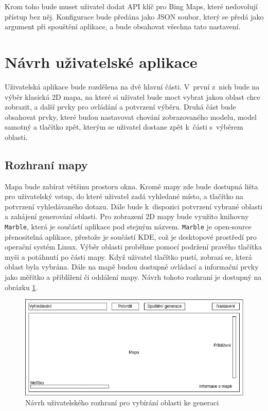 Krom toho bude muset uživatel dodat API klíč pro Bing Maps, které nedovolují přístup bez něj. Konfigurace bude předána jako JSON soubor, který se předá jako argument při spouštění aplikace, a bude obsahovat všechna tato nastavení.


\section{Návrh uživatelské aplikace}
Uživatelská aplikace bude rozdělena na dvě hlavní části. V~první z~nich bude na výběr klasická 2D mapa, na které si uživatel bude moct vybrat jakou oblast chce zobrazit, a další prvky pro ovládání a potvrzení výběru. Druhá část bude obsahovat prvky, které budou nastavovat chování zobrazovaného modelu, model samotný a tlačítko zpět, kterým se uživatel dostane zpět k~části s~výběrem oblasti.

\subsection*{Rozhraní mapy}
Mapa bude zabírat většinu prostoru okna. Kromě mapy zde bude dostupná lišta pro uživatelský vstup, do které uživatel zadá vyhledané místo, a tlačítko na potvrzení vyhledávaného dotazu. Dále bude k~dispozici potvrzení vybrané oblasti a zahájení generování oblasti. Pro zobrazení 2D mapy bude využito knihovny \verb|Marble|, která je součástí aplikace pod stejným názvem. \verb|Marble| je open-source přenositelná aplikace, přestože je součástí KDE, což je desktopové prostředí pro operační systém Linux. Výběr oblasti proběhne pomocí podržení pravého tlačítka myši a potáhnutí po části mapy. Když uživatel tlačítko pustí, zobrazí se, která oblast byla vybrána. Dále na mapě budou dostupné ovládací a informační prvky jako měřítko a přiblížení či oddálení mapy. Návrh tohoto rozhraní je dostupný na obrázku \ref{map-ui}.

\begin{figure}[H]
	\centering
	\includegraphics[width=38em]{images/navrh/map-view.png}
	\caption[caption]{Návrh uživatelského rozhraní pro vybírání oblasti ke generaci} 
	\label{map-ui}
\end{figure}

